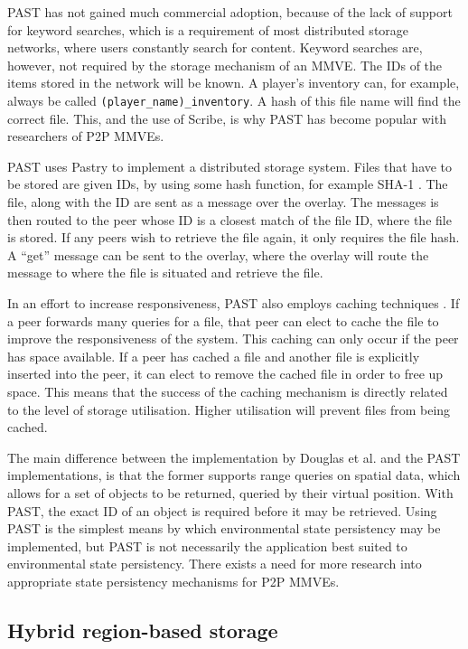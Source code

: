 PAST has not gained much commercial adoption, because of the lack of support for keyword searches, which is a requirement of most distributed storage networks, where users constantly search for content. Keyword searches are, however, not required by the storage mechanism of an MMVE. The IDs of the items stored in the network will be known. A player's inventory can, for example, always be called \verb.(player_name)_inventory.. A hash of this file name will find the correct file. This, and the use of Scribe, is why PAST has become popular with researchers of P2P MMVEs.

PAST \cite{PAST_storage} uses Pastry to implement a distributed storage system. Files that have to be stored are given IDs, by using some hash function, for example SHA-1 \cite{SHA}. The file, along with the ID are sent as a message over the overlay. The messages is then routed to the peer whose ID is a closest match of the file ID, where the file is stored. If any peers wish to retrieve the file again, it only requires the file hash. A ``get'' message can be sent to the overlay, where the overlay will route the message to where the file is situated and retrieve the file.

In an effort to increase responsiveness, PAST also employs caching techniques \cite{storage_and_chaching_PAST}. If a peer forwards many queries for a file, that peer can elect to cache the file to improve the responsiveness of the system. This caching can only occur if the peer has space available. If a peer has cached a file and another file is explicitly inserted into the peer, it can elect to remove the cached file in order to free up space. This means that the success of the caching mechanism is directly related to the level of storage utilisation. Higher utilisation will prevent files
from being cached.

The main difference between the implementation by Douglas et al. and the PAST implementations, is that the former supports range queries on spatial data, which allows for a set of objects to be returned, queried by their virtual position. With PAST, the exact ID of an object is required before it may be retrieved. Using PAST is the simplest means by which environmental state persistency may be implemented, but PAST is not necessarily the application best suited to environmental state persistency. There exists a need for more research into appropriate state persistency mechanisms for P2P MMVEs.

\subsection{Hybrid region-based storage}
\label{hybrid_storage}

